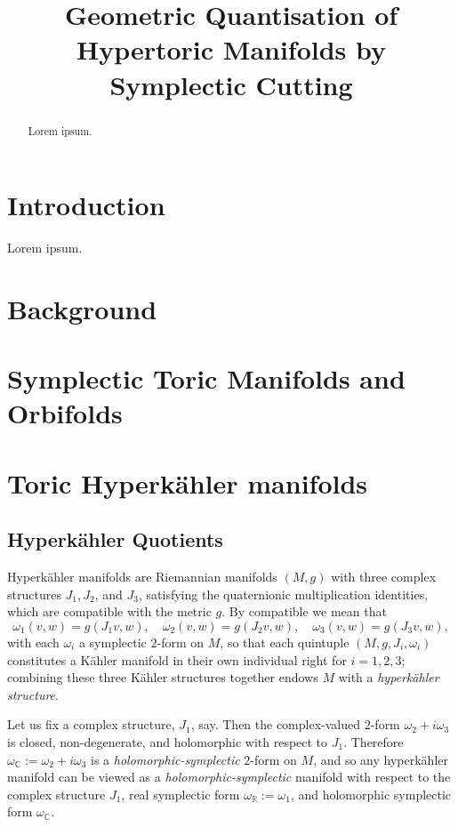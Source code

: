 \documentclass{amsart}
\title{Geometric Quantisation of Hypertoric Manifolds by Symplectic Cutting}
\date{}	%
\newcommand{\w}{\omega}
\newcommand{\RR}{\mathbb{R}}
\newcommand{\CC}{\mathbb{C}}
\begin{document}
	\maketitle
	
	\begin{abstract}
		Lorem ipsum.
	\end{abstract}
	
	\section{Introduction}
	
	Lorem ipsum.
	
	\section{Background}
    
    \section{Symplectic Toric Manifolds and Orbifolds}
	
    
    
	\section{Toric Hyperk\"ahler manifolds}
	
	\subsection{Hyperk\"ahler Quotients}
	
	Hyperk\"ahler manifolds are Riemannian manifolds $(M,g)$ with three complex structures $J_{1}, J_{2}$, and $J_{3}$, satisfying the quaternionic multiplication identities, which are compatible with the metric $g$. By compatible we mean that
	\[
		\w_{1}(v,w) = g(J_{1}v,w),\quad \w_{2}(v,w) = g(J_{2}v,w),\quad \w_{3}(v,w) = g(J_{3}v,w),
	\]
	with each $\w_{i}$ a symplectic $2$-form on $M$, so that each quintuple $(M, g, J_{i}, \w_{i})$ constitutes a K\"ahler manifold in their own individual right for $i = 1, 2, 3$; combining these three K\"ahler structures together endows $M$ with a \emph{hyperk\"ahler structure}.
		
	Let us fix a complex structure, $J_{1}$, say. Then the complex-valued $2$-form $\w_{2} + i\w_{3}$ is closed, non-degenerate, and holomorphic with respect to $J_{1}$. Therefore $\w_{\CC} := \w_{2} + i\w_{3}$ is a \emph{holomorphic-symplectic} $2$-form on $M$, and so any hyperk\"ahler manifold can be viewed as a \emph{holomorphic-symplectic} manifold with respect to the complex structure $J_{1}$, real symplectic form $\w_{\RR} := \w_{1}$, and holomorphic symplectic form $\w_{\CC}$.
	
\end{document}
